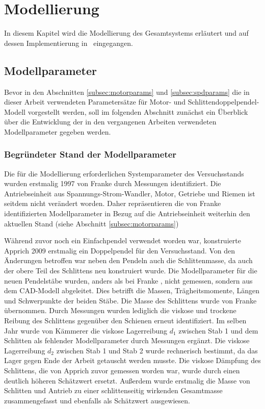 \chapter{Modellierung}\label{cha:modell}

In diesem Kapitel wird die Modellierung des Gesamtsystems erläutert und auf dessen Implementierung in \Simulink\ eingegangen.





\section{Modellparameter}\label{sec:mparams}

Bevor in den Abschnitten \ref{subsec:motorparams} und \ref{subsec:spdparams} die in dieser Arbeit verwendeten Parametersätze für Motor- und Schlittendoppelpendel-Modell vorgestellt werden, soll im folgenden Abschnitt zunächst ein Überblick über die Entwicklung der in den vergangenen Arbeiten verwendeten Modellparameter gegeben werden.  

\subsection{Begründeter Stand der Modellparameter}\label{subsec:paramshist}

Die für die Modellierung erforderlichen Systemparameter des Versuchsstands wurden erstmalig 1997 von Franke \cite{franke} durch Messungen identifiziert. Die Antriebseinheit aus Spannungs-Strom-Wandler, Motor, Getriebe und Riemen ist seitdem nicht verändert worden. Daher repräsentieren die von Franke \cite{franke} identifizierten Modellparameter in Bezug auf die Antriebseinheit weiterhin den aktuellen Stand (siehe Abschnitt \ref{subsec:motorparams})
   
Während zuvor noch ein Einfachpendel verwendet worden war, konstruierte Apprich \cite{apprich} 2009 erstmalig ein Doppelpendel für den Versuchsstand. Von den Änderungen betroffen war neben den Pendeln auch die Schlittenmasse, da auch der obere Teil des Schlittens neu konstruiert wurde. Die Modellparameter für die neuen Pendelstäbe wurden, anders als bei Franke \cite{franke}, nicht gemessen, sondern aus dem CAD-Modell abgeleitet. Dies betrifft die Massen, Trägheitsmomente, Längen und Schwerpunkte der beiden Stäbe. Die Masse des Schlittens wurde von Franke \cite{franke} übernommen. Durch Messungen wurden lediglich die viskose und trockene Reibung des Schlittens gegenüber den Schienen erneut identifiziert. Im selben Jahr wurde von Kämmerer \cite{kämmerer} die viskose Lagerreibung $d_1$ zwischen Stab 1 und dem Schlitten als fehlender Modellparameter durch Messungen ergänzt. Die viskose Lagerreibung $d_2$ zwischen Stab 1 und Stab 2 wurde rechnerisch bestimmt, da das Lager gegen Ende der Arbeit getauscht werden musste. Die viskose Dämpfung des Schlittens, die von Apprich \cite{apprich} zuvor gemessen worden war, wurde durch einen deutlich höheren Schätzwert ersetzt. Außerdem wurde erstmalig die Masse von Schlitten und Antrieb zu einer schlittenseitig wirkenden Gesamtmasse zusammengefasst und ebenfalls als Schätzwert ausgewiesen.

